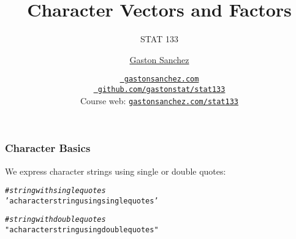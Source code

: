 \documentclass[12pt]{beamer}\usepackage[]{graphicx}\usepackage[]{color}
\title{Character Vectors and Factors}
\subtitle{STAT 133}
\author{\href{http://www.gastonsanchez.com}{Gaston Sanchez}}
\institute{Department of Statistics, UC{\textendash}Berkeley}
\date{\href{http://www.gastonsanchez.com}{\tt \scriptsize \color{foreground} gastonsanchez.com}
\\[-4pt]
\href{http://github.com/gastonstat/stat133}{\tt \scriptsize \color{foreground} github.com/gastonstat/stat133}
\\[-4pt]
{\scriptsize Course web: \href{http://www.gastonsanchez.com/stat133}{\tt gastonsanchez.com/stat133}}
}
\makeatletter
\newcommand{\hlstr}[1]{\textcolor[rgb]{0.192,0.494,0.8}{#1}}%
\newcommand{\hlcom}[1]{\textcolor[rgb]{0.678,0.584,0.686}{\textit{#1}}}%
\newenvironment{kframe}{%
 \def\at@end@of@kframe{}%
 \ifinner\ifhmode%
  \def\at@end@of@kframe{\end{minipage}}%
  \begin{minipage}{\columnwidth}%
 \fi\fi%
 \def\FrameCommand##1{\hskip\@totalleftmargin \hskip-\fboxsep
 \colorbox{shadecolor}{##1}\hskip-\fboxsep
     \hskip-\linewidth \hskip-\@totalleftmargin \hskip\columnwidth}%
 \MakeFramed {\advance\hsize-\width
   \@totalleftmargin\z@ \linewidth\hsize
   \@setminipage}}%
 {\par\unskip\endMakeFramed%
 \at@end@of@kframe}
\newenvironment{knitrout}{}{} %
\makeatother
\begin{document}
{
  \frame{
    \titlepage
  } 
}


\begin{frame}
\begin{center}
\Huge{}
\end{center}
\end{frame}


\begin{frame}[fragile]
\frametitle{Character Basics}

We express character strings using single or double quotes:
\begin{knitrout}\footnotesize
{}\color{fgcolor}\begin{kframe}
\begin{alltt}
\hlcom{# string with single quotes}
\hlstr{'a character string using single quotes'}
\end{alltt}
\end{kframe}
\end{knitrout}

\begin{knitrout}\footnotesize
{}\color{fgcolor}\begin{kframe}
\begin{alltt}
\hlcom{# string with double quotes}
\hlstr{"a character string using double quotes"}
\end{alltt}
\end{kframe}
\end{knitrout}

\end{frame}

\end{document}
